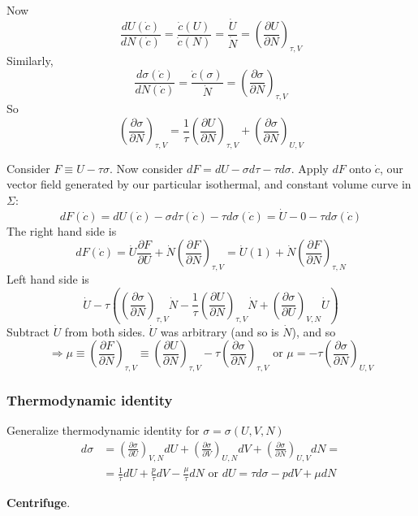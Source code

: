Now \[
\frac{dU(\dot{c})}{dN(\dot{c})} = \frac{\dot{c}(U)}{\dot{c}(N)} = \frac{\dot{U}}{\dot{N}} = \left( \frac{ \partial U}{ \partial N} \right)_{\tau,V} 
\]
Similarly, 
\[
\frac{d\sigma(\dot{c})}{dN(\dot{c})} = \frac{\dot{c}(\sigma)}{ \dot{N}} = \left( \frac{\partial \sigma}{\partial N} \right)_{\tau,V}
\]
So
\[
\left( \frac{ \partial \sigma}{ \partial N} \right)_{\tau,V} = \frac{1}{\tau} \left( \frac{ \partial U}{ \partial N} \right)_{\tau,V} + \left( \frac{ \partial \sigma}{ \partial N} \right)_{U,V}
\]

Consider $F \equiv U-\tau \sigma$.  Now consider $dF = dU- \sigma d\tau - \tau d\sigma$.  Apply $dF$ onto $\dot{c}$, our vector field generated by our particular isothermal, and constant volume curve in $\Sigma$:
\[
dF(\dot{c}) = dU(\dot{c}) - \sigma d\tau (\dot{c}) - \tau d\sigma(\dot{c}) = \dot{U}- 0 - \tau d\sigma(\dot{c})
\]
The right hand side is 
\[
dF(\dot{c}) = \dot{U} \frac{ \partial F}{ \partial U} + \dot{N} \left( \frac{ \partial F}{ \partial N} \right)_{\tau,V} = \dot{U}(1) + \dot{N} \left( \frac{ \partial F}{ \partial N} \right)_{\tau,N}
\]
Left hand side is 
\[
\dot{U}- \tau \left( \left( \frac{ \partial \sigma}{ \partial N} \right)_{\tau,V} \dot{N} - \frac{1}{\tau} \left( \frac{ \partial U}{ \partial N} \right)_{\tau,V} \dot{N} + \left( \frac{ \partial \sigma}{ \partial U} \right)_{V,N} \dot{U} \right)
\]
Subtract $\dot{U}$ from both sides.  $\dot{U}$ was arbitrary (and so is $\dot{N}$), and so
\[
\Longrightarrow \mu \equiv \left( \frac{ \partial F}{ \partial N} \right)_{\tau,V} \equiv \left( \frac{\partial U}{ \partial N}\right)_{\tau,V} - \tau \left( \frac{ \partial \sigma}{\partial N}\right)_{\tau,V} \text{ or } \mu = -\tau \left( \frac{ \partial \sigma}{\partial N}\right)_{U,V}
\]

\subsubsection*{Thermodynamic identity} Generalize thermodynamic identity for $\sigma = \sigma(U,V,N)$
\[
\begin{aligned}
  d\sigma & = \left( \frac{ \partial \sigma}{\partial U} \right)_{V,N} dU + \left( \frac{ \partial \sigma}{ \partial V} \right)_{U,N} dV + \left( \frac{ \partial \sigma}{ \partial N} \right)_{U,V} dN = \\
  & = \frac{1}{\tau} dU + \frac{p}{\tau} dV - \frac{\mu}{\tau} dN \text{ or } dU = \tau d\sigma - p dV + \mu dN
\end{aligned}
\]

 \textbf{Centrifuge}.  

